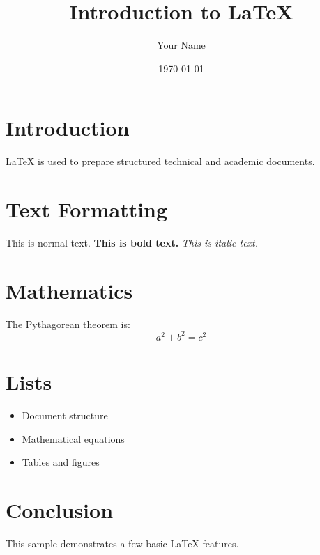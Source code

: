 \documentclass[12pt,a4paper]{article}
\title{Introduction to LaTeX}
\author{Your Name}
\date{\today}
\begin{document}
\maketitle

\section{Introduction}
LaTeX is used to prepare structured technical and academic documents.

\section{Text Formatting}
This is normal text. \textbf{This is bold text.} \textit{This is italic text.}

\section{Mathematics}
The Pythagorean theorem is:
\[
a^2+b^2=c^2
\]

\section{Lists}
\begin{itemize}
    \item Document structure
    \item Mathematical equations
    \item Tables and figures
\end{itemize}

\section{Conclusion}
This sample demonstrates a few basic LaTeX features.
\end{document}
